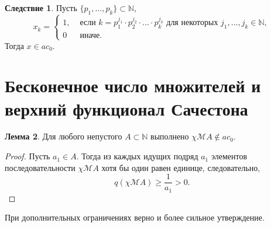 \documentclass[a4paper,openbib]{article}
\renewcommand{\geq}{\geqslant} %
\theoremstyle{definition}
\newtheorem{lemma}{Лемма}[section]
\newtheorem{corollary}[lemma]{Следствие}
\begin{document}
\begin{corollary}
	\label{cor:ac0_powers_finite_set_of_numbers}
	Пусть $\{p_1, ..., p_k\} \subset \mathbb{N}$,
	\begin{equation}
		x_k = \begin{cases}
			1, &\mbox{~если~} k = p_1^{j_1}\cdot p_2^{j_2}\cdot ... \cdot p_k^{j_k} \mbox{~для некоторых~} j_1,...,j_k\in\mathbb{N},
			\\
			0  &\mbox{~иначе}.
		\end{cases}
	\end{equation}
	Тогда $x\in ac_0$.
\end{corollary}




\section{Бесконечное число множителей и \\  верхний функционал Сачестона}




\begin{lemma}
	Для любого непустого $A\subset \mathbb{N} $ выполнено $\chi\mathscr{M}A \notin ac_0$.
\end{lemma}
\begin{proof}
	Пусть $a_1\in A$.
	Тогда из каждых идущих подряд $a_1$ элементов последовательности $\chi\mathscr{M}A$
	хотя бы один равен единице,
	следовательно,
	\begin{equation}
		q(\chi\mathscr{M}A) \geq \frac{1}{a_1} > 0
		.
	\end{equation}
\end{proof}

При дополнительных ограничениях верно и более сильное утверждение.
\end{document}
